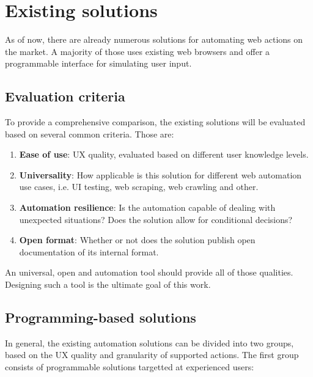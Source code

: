 
\section{Existing solutions} \label{competition}
As of now, there are already numerous solutions for automating web actions on the market. 
A majority of those uses existing web browsers and offer a programmable interface for simulating user input.

\subsection{Evaluation criteria}
To provide a comprehensive comparison, the existing solutions will be evaluated based on several common criteria. Those are:
\begin{enumerate}
    \item \textbf{Ease of use}: \Ac{UX} quality, evaluated based on different user knowledge levels.
    \item \textbf{Universality}: How applicable is this solution for different web automation use cases, i.e. \ac{UI} testing, web scraping, web crawling and other.
    \item \textbf{Automation resilience}: Is the automation capable of dealing with unexpected situations? Does the solution allow for conditional decisions?
    \item \textbf{Open format}: Whether or not does the solution publish open documentation of its internal format.
\end{enumerate}

An universal, open and automation tool should provide all of those qualities. 
Designing such a tool is the ultimate goal of this work.

\subsection{Programming-based solutions}

In general, the existing automation solutions can be divided into two groups, based on the \ac{UX} quality and granularity of supported actions. 
The first group consists of programmable solutions targetted at experienced users:

\emptyline

